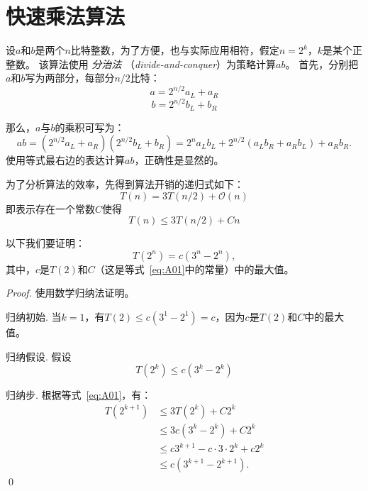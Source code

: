 
\appendix

\chapter{快速乘法算法}
\label{chap:fast_mul}

设$a$和$b$是两个$n$比特整数，为了方便，也与实际应用相符，假定$n = 2^k$，$k$是某个正整数。
 该算法使用
 \textit{分治法}
（\textit{divide-and-conquer}）为策略计算$ab$。
首先，分别把$a$和$b$写为两部分，每部分$n/2$比特：
\[ a = 2^{n/2}a_L + a_R\]
\[b = 2^{n/2} b_L + b_R\]

那么，$a$与$b$的乘积可写为：
\[ ab =(2^{n/2}a_L + a_R)(2^{n/2} b_L + b_R) = 2^n a_L b_L + 2^{n/2}(a_L b_R + a_R b_L) + a_R b_R.\]
使用等式最右边的表达计算$ab$，正确性是显然的。

为了分析算法的效率，先得到算法开销的递归式如下：
\[T(n) = 3T(n/2) + \mathcal{O}(n)\]
即表示存在一个常数$C$使得
\begin{equation}
\label{eq:A01}
T(n) \leq 3T(n/2) + Cn
\end{equation}

以下我们要证明：
\begin{equation}
\label{eq:A02}
T(2^n) = c(3^n - 2^n),
\end{equation}
其中，$c$是$T(2)$和$C$（这是等式~\ref{eq:A01}中的常量）中的最大值。


\begin{proof}
使用数学归纳法证明。

归纳初始. 当$k = 1$，有$T(2) \leq c(3^1 - 2^1) = c$，因为$c$是$T(2)$和$C$中的最大值。

归纳假设. 假设 
\[T(2^k) \leq c(3^k - 2^k)\]

归纳步. 根据等式~\ref{eq:A01}，有：
\begin{align*}
T(2^{k+1}) &\leq 3T(2^k) +C2^k\\
                    &\leq 3c(3^k - 2^k) + C2^k\\
                    &\leq c3^{k+1} - c\cdot 3\cdot 2^k + c2^k\\
                    &\leq c(3^{k+1} - 2^{k+1}).
\end{align*} \qed
\end{proof}

